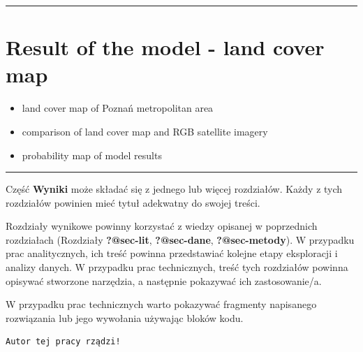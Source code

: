 \documentclass{amuthesis}
\begin{document}
\begin{center}\rule{0.5\linewidth}{0.5pt}\end{center}


\hypertarget{sec-results-map}{%
\chapter{Result of the model - land cover map}\label{sec-results-map}}

\begin{itemize}
\item
  land cover map of Poznań metropolitan area
\item
  comparison of land cover map and RGB satellite imagery
\item
  probability map of model results
\end{itemize}

\begin{center}\rule{0.5\linewidth}{0.5pt}\end{center}

Część \textbf{Wyniki} może składać się z jednego lub więcej rozdziałów.
Każdy z tych rozdziałów powinien mieć tytuł adekwatny do swojej treści.

Rozdziały wynikowe powinny korzystać z wiedzy opisanej w poprzednich
rozdziałach (Rozdziały \textbf{?@sec-lit}, \textbf{?@sec-dane},
\textbf{?@sec-metody}). W przypadku prac analitycznych, ich treść
powinna przedstawiać kolejne etapy eksploracji i analizy danych. W
przypadku prac technicznych, treść tych rozdziałów powinna opisywać
stworzone narzędzia, a następnie pokazywać ich zastosowanie/a.

W przypadku prac technicznych warto pokazywać fragmenty napisanego
rozwiązania lub jego wywołania używając bloków kodu.

\begin{Shaded}
\begin{Highlighting}[]
\OtherTok{=} 
  \NormalTok{)}
\NormalTok{\}}
\NormalTok{(}\NormalTok{)}
\end{Highlighting}
\end{Shaded}

\begin{verbatim}
Autor tej pracy rządzi!
\end{verbatim}
\end{document}

